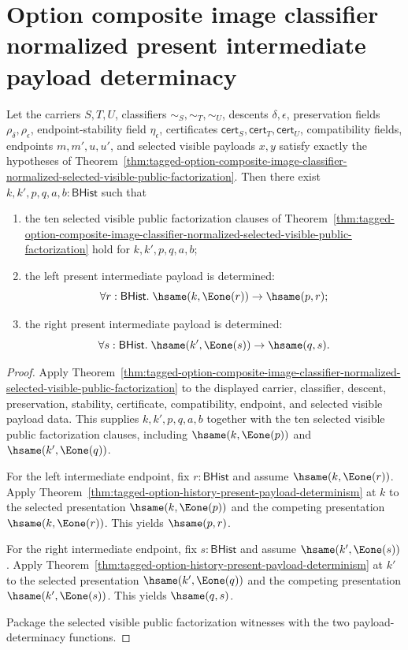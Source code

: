 \section{Option composite image classifier normalized present intermediate payload determinacy}
\label{sec:option-composite-image-classifier-normalized-present-intermediate-payload-determinacy}

\begin{theorem}
\label{thm:tagged-option-composite-image-classifier-normalized-present-intermediate-payload-determinacy}
Let the carriers $S,T,U$, classifiers $\sim_S,\sim_T,\sim_U$, descents
$\delta,\epsilon$, preservation fields $\rho_{\delta},\rho_{\epsilon}$,
endpoint-stability field $\eta_{\epsilon}$, certificates
$\mathsf{cert}_S,\mathsf{cert}_T,\mathsf{cert}_U$, compatibility fields,
endpoints $m,m',u,u'$, and selected visible payloads $x,y$ satisfy exactly the
hypotheses of
Theorem~\ref{thm:tagged-option-composite-image-classifier-normalized-selected-visible-public-factorization}.
Then there exist $k,k',p,q,a,b:\mathsf{BHist}$ such that
\begin{enumerate}
\item the ten selected visible public factorization clauses of
Theorem~\ref{thm:tagged-option-composite-image-classifier-normalized-selected-visible-public-factorization}
hold for $k,k',p,q,a,b$;
\item the left present intermediate payload is determined:
$$
\forall r:\mathsf{BHist}.\;\hsame(k,\Eone(r))\to\hsame(p,r);
$$
\item the right present intermediate payload is determined:
$$
\forall s:\mathsf{BHist}.\;\hsame(k',\Eone(s))\to\hsame(q,s).
$$
\end{enumerate}
\end{theorem}
\begin{proof}
Apply
Theorem~\ref{thm:tagged-option-composite-image-classifier-normalized-selected-visible-public-factorization}
to the displayed carrier, classifier, descent, preservation, stability,
certificate, compatibility, endpoint, and selected visible payload data. This
supplies $k,k',p,q,a,b$ together with the ten selected visible public
factorization clauses, including $\hsame(k,\Eone(p))$ and
$\hsame(k',\Eone(q))$.

For the left intermediate endpoint, fix $r:\mathsf{BHist}$ and assume
$\hsame(k,\Eone(r))$. Apply
Theorem~\ref{thm:tagged-option-history-present-payload-determinism} at $k$ to
the selected presentation $\hsame(k,\Eone(p))$ and the competing presentation
$\hsame(k,\Eone(r))$. This yields $\hsame(p,r)$.

For the right intermediate endpoint, fix $s:\mathsf{BHist}$ and assume
$\hsame(k',\Eone(s))$. Apply
Theorem~\ref{thm:tagged-option-history-present-payload-determinism} at $k'$ to
the selected presentation $\hsame(k',\Eone(q))$ and the competing presentation
$\hsame(k',\Eone(s))$. This yields $\hsame(q,s)$.

Package the selected visible public factorization witnesses with the two
payload-determinacy functions.
\end{proof}
